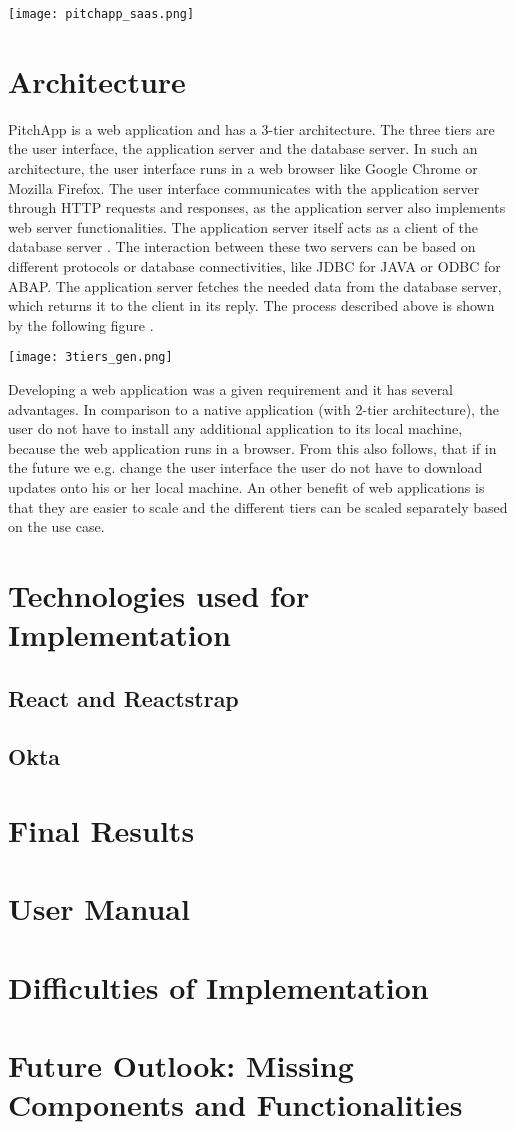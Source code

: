 \texttt{[image: pitchapp\_saas.png]}



\chapter{Architecture}

PitchApp is a web application and has a 3-tier architecture. The three tiers are the user interface, the application server and the database server. In such an architecture, the user interface runs in a web browser like Google Chrome or Mozilla Firefox. The user interface communicates with the application server through HTTP requests and responses, as the application server also implements web server functionalities. The application server itself acts as a client of the database server \parencite[p.~80]{MT17}. The interaction between these two servers can be based on different protocols or database connectivities, like JDBC for JAVA or ODBC for ABAP. The application server fetches the needed data from the database server, which returns it to the client in its reply. The process described above is shown by the following figure \parencite[p.~80]{MT17}.

\texttt{[image: 3tiers\_gen.png]}

Developing a web application was a given requirement and it has several advantages. In comparison to a native application (with 2-tier architecture), the user do not have to install any additional application to its local machine, because the web application runs in a browser. From this also follows, that if in the future we e.g. change the user interface the user do not have to download updates onto his or her local machine. An other benefit of web applications is that they are easier to scale and the different tiers can be scaled separately based on the use case.  

\chapter{Technologies used for Implementation}
\section{React and Reactstrap}
\section{Okta}
\chapter{Final Results}
\chapter{User Manual}
\chapter{Difficulties of Implementation}
\chapter{Future Outlook: Missing Components and Functionalities}



